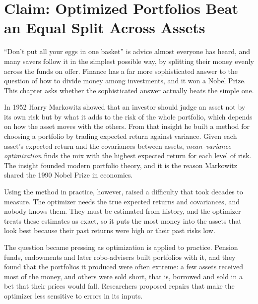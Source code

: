\makeatletter
\makeatother

\chapter{Claim: Optimized Portfolios Beat an Equal Split Across Assets}
\label{ch:09}
\providecommand{\term}[1]{\emph{#1}}

``Don't put all your eggs in one basket'' is advice almost everyone has heard, and many savers follow it in the simplest possible way, by splitting their money evenly across the funds on offer. Finance has a far more sophisticated answer to the question of how to divide money among investments, and it won a Nobel Prize. This chapter asks whether the sophisticated answer actually beats the simple one.

In 1952 Harry Markowitz showed that an investor should judge an asset not by its own risk but by what it adds to the risk of the whole portfolio, which depends on how the asset moves with the others. From that insight he built a method for choosing a portfolio by trading expected return against variance. Given each asset's expected return and the covariances between assets, \term{mean--variance optimization} finds the mix with the highest expected return for each level of risk. The insight founded modern portfolio theory, and it is the reason Markowitz shared the 1990 Nobel Prize in economics. 

Using the method in practice, however, raised a difficulty that took decades to measure. The optimizer needs the true expected returns and covariances, and nobody knows them. They must be estimated from history, and the optimizer treats these estimates as exact, so it puts the most money into the assets that look best because their past returns were high or their past risks low.

The question became pressing as optimization is applied to practice. Pension funds, endowments and later robo-advisers built portfolios with it, and they found that the portfolios it produced were often extreme: a few assets received most of the money, and others were sold short, that is, borrowed and sold in a bet that their prices would fall. Researchers proposed repairs that make the optimizer less sensitive to errors in its inputs. 


